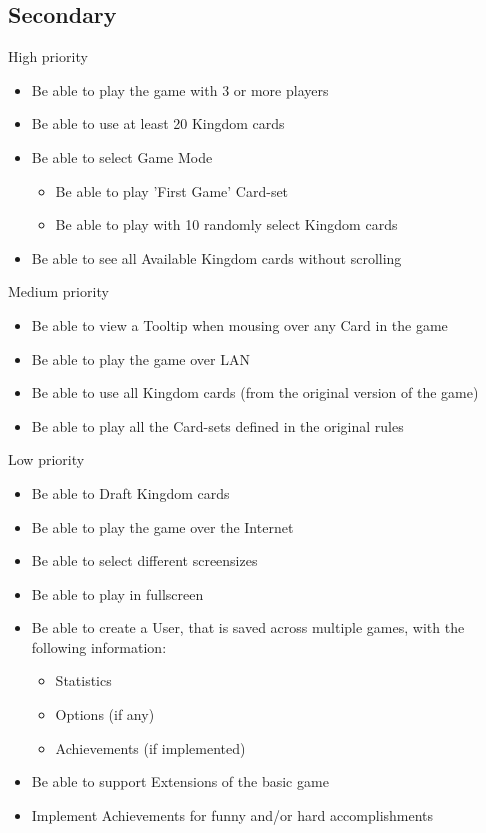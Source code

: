 \documentclass[12pt,a4paper,notitlepage]{article}
\begin{document}
\subsection{Secondary}
High priority
\begin{itemize}
\item Be able to play the game with 3 or more players
\item Be able to use at least 20 Kingdom cards
\item Be able to select Game Mode
\begin{itemize}
\item Be able to play 'First Game' Card-set
\item Be able to play with 10 randomly select Kingdom cards
\end{itemize}
\item Be able to see all Available Kingdom cards without scrolling
\end{itemize}
Medium priority
\begin{itemize}
\item Be able to view a Tooltip when mousing over any Card in the game
\item Be able to play the game over LAN
\item Be able to use all Kingdom cards (from the original version of the game)
\item Be able to play all the Card-sets defined in the original rules
\end{itemize}
Low priority
\begin{itemize}
\item Be able to Draft Kingdom cards
\item Be able to play the game over the Internet
\item Be able to select different screensizes
\item Be able to play in fullscreen
\item Be able to create a User, that is saved across multiple games, with the following information:
\begin{itemize}
\item Statistics
\item Options (if any)
\item Achievements (if implemented)
\end{itemize}
\item Be able to support Extensions of the basic game
\item Implement Achievements for funny and/or hard accomplishments
\end{itemize}
\end{document}
